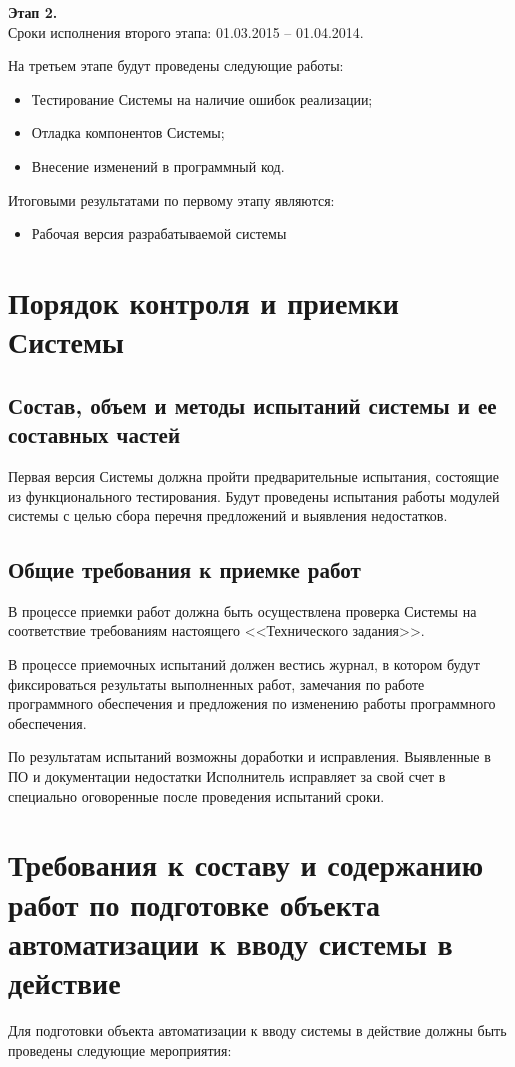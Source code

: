\textbf{Этап 2.}\\
Сроки исполнения второго этапа: 01.03.2015 -- 01.04.2014.

На третьем этапе будут проведены следующие работы:
\begin{itemize}
  \item Тестирование Системы на наличие ошибок реализации;
  \item Отладка компонентов Системы;
  \item Внесение изменений в программный код.
\end{itemize}
Итоговыми результатами по первому этапу являются:
\begin{itemize}
  \item Рабочая версия разрабатываемой системы
\end{itemize}

\chapter{Порядок контроля и приемки Системы}
\section{Состав, объем и методы испытаний системы и ее составных частей}
Первая версия Системы должна пройти предварительные испытания, состоящие из
функционального тестирования. Будут проведены испытания работы модулей системы
с целью сбора перечня предложений и выявления недостатков. 

\section{Общие требования к приемке работ}
В процессе приемки работ должна быть осуществлена проверка Системы на
соответствие требованиям настоящего <<Технического задания>>.

В процессе приемочных испытаний должен вестись журнал, в котором будут
фиксироваться результаты выполненных работ, замечания по работе программного
обеспечения и предложения по изменению работы программного обеспечения.

По результатам испытаний возможны доработки и исправления. Выявленные в ПО и
документации недостатки Исполнитель исправляет за свой счет в специально
оговоренные после проведения испытаний сроки.

\chapter{Требования к составу и содержанию работ по подготовке объекта
автоматизации к вводу системы в действие}
Для подготовки объекта автоматизации к вводу системы в действие должны быть проведены 
следующие мероприятия:

